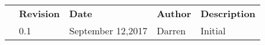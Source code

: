 \vspace*{2.5cm}
{}
\vspace*{2cm}

{}
\renewcommand\arraystretch{2}%
\begin{table}[htbp]\large
\begin{tabular}{p{0cm}p{3cm}p{4cm}p{3cm}p{6cm}}%
\toprule[0pt] 
\arrayrulecolor{gray}%
\rowcolor[gray]{0.9}  
&\bf{Revision} &\bf{Date}   &\bf{Author}  &\bf{Description}\\   
&0.1 &September 12,2017  &Darren  &Initial\\ 
\bottomrule[0.5pt]  
\end{tabular}  
\end{table}

\clearpage
